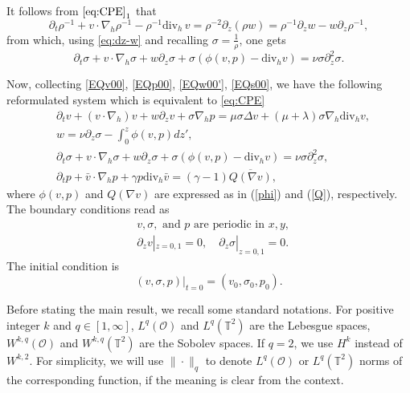 \documentclass[12pt,reqno]{amsart}
\numberwithin{equation}{section}
\newcommand{\dt}{\partial_t}
\newcommand{\dz}[0]{\partial_z}
\newcommand{\dvh}[0]{\mathrm{div}_{h}\,}
\newcommand{\nablah}[0]{\nabla_{h}}
\newcommand{\subeqref}[2]{$\eqref{#1}_{#2}$}
\begin{document}
It follows from \subeqref{eq:CPE}{1} that
\begin{equation*}\label{eq:rho-1}
	\dt \rho^{-1} + v \cdot \nablah \rho^{-1} - \rho^{-1} \dvh v = \rho^{-2} \dz (\rho w) = \rho^{-1} \dz w - w \dz \rho^{-1},
\end{equation*}
from which, using \eqref{eq:dz-w} and recalling $\sigma=\frac1\rho$, one gets
\begin{equation}\label{EQs00}
	\partial_t\sigma+v\cdot\nabla_h\sigma+w\partial_z\sigma+\sigma(\phi(v,p)-\text{div}_hv)=\nu\sigma\partial_z^2\sigma.
\end{equation}


Now, collecting \eqref{EQv00}, \eqref{EQp00}, \eqref{EQw00'}, \eqref{EQs00}, we have the following reformulated system which is equivalent to \eqref{eq:CPE}
\begin{eqnarray}
  &\partial_tv+(v\cdot\nabla_h)v+w\partial_zv+\sigma\nabla_hp=\mu\sigma\Delta v+(\mu+\lambda)\sigma\nabla_h\text{div}_hv,\label{EQv0}\\
  &w=\nu\partial_z\sigma-\int_0^z\phi(v,p)dz',\label{EQw0}\\
  &\partial_t\sigma+v\cdot\nabla_h\sigma+w\partial_z\sigma+\sigma(\phi(v,p)-\text{div}_hv)=\nu\sigma\partial_z^2\sigma,
  \label{EQs0}\\
  &\partial_tp+\bar v\cdot\nabla_hp+\gamma p\text{div}_h\bar v=(\gamma-1)\overline{Q(\nabla v)}, \label{EQp0}
\end{eqnarray}
where $\phi(v,p)$ and $Q(\nabla v)$ are expressed as in (\ref{phi}) and (\ref{Q}), respectively. The boundary conditions read as
\begin{eqnarray}
  &v, \sigma, \mbox{ and } p \mbox{ are periodic in }x, y, \label{BC1}\\
  &\partial_zv|_{z=0,1}=0, \quad\partial_z\sigma|_{z=0,1}=0. \label{BC2}
\end{eqnarray}
The initial condition is
\begin{equation}
  \label{IC}
  (v, \sigma, p)|_{t=0}=(v_{0}, \sigma_{0}, p_{0}).
\end{equation}

Before stating the main result, we recall some standard notations. For positive integer $k$ and $q\in[1,\infty]$, $L^q(\mathcal O)$ and
$L^q(\mathbb T^2)$ are the Lebesgue spaces,
$W^{k,q}(\mathcal O)$ and $W^{k,q}(\mathbb T^2)$ are the Sobolev spaces. If $q=2$, we use $H^k$ instead of $W^{k,2}$. For simplicity,
we will use $\|\cdot\|_q$ to denote $L^q(\mathcal O)$ or $L^q(\mathbb T^2)$ norms of the corresponding function,
if the meaning is clear from the context.
\end{document}
